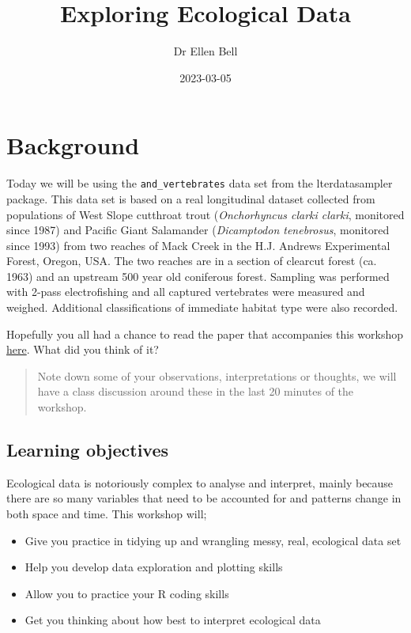 \documentclass[
]{book}
\title{Exploring Ecological Data}
\author{Dr Ellen Bell}
\date{2023-03-05}
\providecommand{\tightlist}{%
  \setlength{\itemsep}{0pt}\setlength{\parskip}{0pt}}
\begin{document}
\maketitle

{
\setcounter{tocdepth}{1}
\tableofcontents
}
\hypertarget{background}{%
\chapter{Background}\label{background}}

Today we will be using the \texttt{and\_vertebrates} data set from the lterdatasampler package. This data set is based on a real longitudinal dataset collected from populations of West Slope cutthroat trout (\emph{Onchorhyncus clarki clarki}, monitored since 1987) and Pacific Giant Salamander (\emph{Dicamptodon tenebrosus}, monitored since 1993) from two reaches of Mack Creek in the H.J. Andrews Experimental Forest, Oregon, USA. The two reaches are in a section of clearcut forest (ca. 1963) and an upstream 500 year old coniferous forest. Sampling was performed with 2-pass electrofishing and all captured vertebrates were measured and weighed. Additional classifications of immediate habitat type were also recorded.

Hopefully you all had a chance to read the paper that accompanies this workshop \href{https://esajournals.onlinelibrary.wiley.com/doi/full/10.1002/ecs2.1845}{here}. What did you think of it?

\begin{quote}
Note down some of your observations, interpretations or thoughts, we will have a class discussion around these in the last 20 minutes of the workshop.
\end{quote}

\hypertarget{learning-objectives}{%
\section{Learning objectives}\label{learning-objectives}}

Ecological data is notoriously complex to analyse and interpret, mainly because there are so many variables that need to be accounted for and patterns change in both space and time. This workshop will;

\begin{itemize}
\tightlist
\item
  Give you practice in tidying up and wrangling messy, real, ecological data set
\item
  Help you develop data exploration and plotting skills
\item
  Allow you to practice your R coding skills
\item
  Get you thinking about how best to interpret ecological data
\end{itemize}
\end{document}
